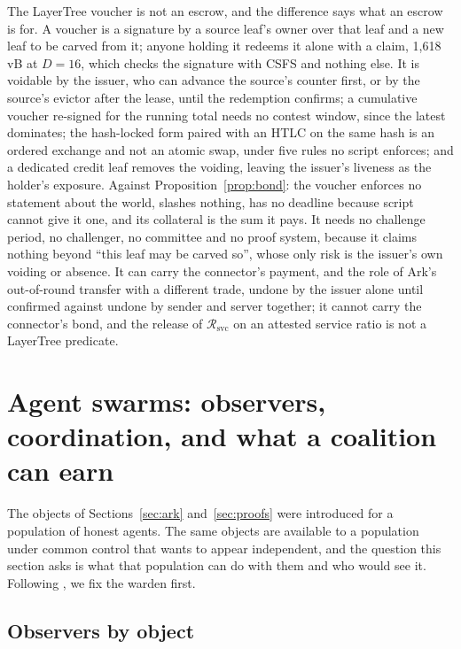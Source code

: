 \documentclass[11pt]{article}
\theoremstyle{plain}
\theoremstyle{definition}
\theoremstyle{remark}
\newcommand{\Rsvc}{\mathcal{R}_{\mathrm{svc}}}
\begin{document}
The LayerTree voucher is not an escrow, and the difference says what an escrow is for. A voucher is a signature by a source leaf's owner over that leaf and a new leaf to be carved from it; anyone holding it redeems it alone with a claim, 1{,}618\,vB at $D=16$, which checks the signature with CSFS and nothing else. It is voidable by the issuer, who can advance the source's counter first, or by the source's evictor after the lease, until the redemption confirms; a cumulative voucher re-signed for the running total needs no contest window, since the latest dominates; the hash-locked form paired with an HTLC on the same hash is an ordered exchange and not an atomic swap, under five rules no script enforces; and a dedicated credit leaf removes the voiding, leaving the issuer's liveness as the holder's exposure. Against Proposition~\ref{prop:bond}: the voucher enforces no statement about the world, slashes nothing, has no deadline because script cannot give it one, and its collateral is the sum it pays. It needs no challenge period, no challenger, no committee and no proof system, because it claims nothing beyond ``this leaf may be carved so'', whose only risk is the issuer's own voiding or absence. It can carry the connector's payment, and the role of Ark's out-of-round transfer with a different trade, undone by the issuer alone until confirmed against undone by sender and server together; it cannot carry the connector's bond, and the release of $\Rsvc$ on an attested service ratio is not a LayerTree predicate.

\section{Agent swarms: observers, coordination, and what a coalition can earn}
\label{sec:agents}

The objects of Sections~\ref{sec:ark} and~\ref{sec:proofs} were introduced for a population of honest agents. The same objects are available to a population under common control that wants to appear independent, and the question this section asks is what that population can do with them and who would see it. Following \citet{simmons1984prisoners}, we fix the warden first.

\subsection{Observers by object}
\end{document}
